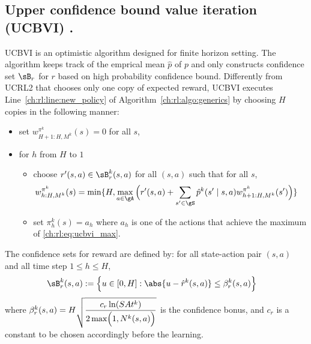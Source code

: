 \subsection{Upper confidence bound value iteration (UCBVI) \texorpdfstring{\cite{azar2017minimax}}{[AOM17]}.}
UCBVI is an optimistic algorithm designed for finite horizon setting.
The algorithm keeps track of the emprical mean $\hat{p}$ of $p$ and only constructs confidence set $\sB_r$ for $r$ based on high probability confidence bound.
Differently from UCRL2 that chooses only one copy of expected reward, UCBVI executes Line~\ref{ch:rl:line:new_policy} of Algorithm~\ref{ch:rl:algo:generics} by choosing $H$ copies in the following manner:
\begin{itemize}
    \item set $w^{\pi^k}_{H+1:H,M^k}(s)=0$ for all $s$,
    \item for $h$ from $H$ to $1$
        \begin{itemize}
            \item choose $r'(s,a)\in\sB^k_r(s,a)$ for all $(s,a)$ such that for all $s$,
            \begin{align}
                w^{\pi^k}_{h:H,M^k}(s) &=\min\{H, \max_{a\in\gA}\Big(r'(s,a)+\sum_{s'\in\gS}\hat{p}^k(s'\mid s,a)w_{h+1:H,M^k}^{\pi^k}(s')\Big)\} \label{ch:rl:eq:ucbvi_max}
            \end{align}
            \item set $\pi^k_h(s)=a_h$ where $a_h$ is one of the actions that achieve the maximum of \eqref{ch:rl:eq:ucbvi_max}.
        \end{itemize}
\end{itemize}
The confidence sets for reward are defined by: for all state-action pair $(s,a)$ and all time step $1\le h\le H$,
\begin{align*}
    \sB_r^k(s,a)&:=\Bigl\{u\in[0,H] : \abs{u-\hat{r}^k(s,a)}\le\beta^k_r(s,a)\Bigr\}
\end{align*}
where $\beta_r^k(s,a)=\displaystyle H\sqrt{\frac{c_r\ln(SAt^k)}{2\max\Bigl(1,N^k(s,a)\Bigr)}}$ is the confidence bonus, and $c_r$ is a constant to be chosen accordingly before the learning.


